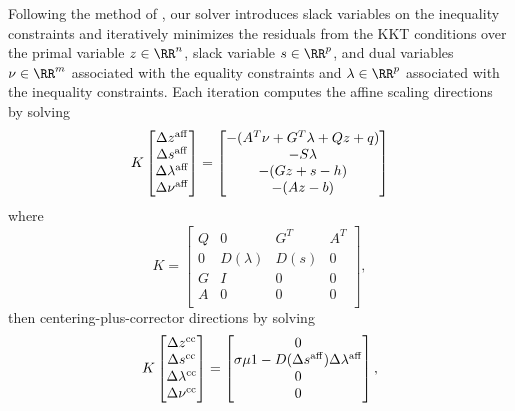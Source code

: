 Following the method of \citet{mattingley2012cvxgen},
our solver introduces slack variables on the inequality constraints
and iteratively minimizes the residuals from the KKT conditions
over the primal variable $z\in\RR^n$, slack variable $s\in\RR^p$,
and dual variables
$\nu\in\RR^m$ associated with the equality constraints and
$\lambda\in\RR^p$ associated with the inequality constraints.
Each iteration computes the affine scaling directions by solving
\begin{equation}
  K
  \begin{bmatrix}
    \Delta z^{\rm aff} \\
    \Delta s^{\rm aff} \\
    \Delta \lambda^{\rm aff} \\
    \Delta \nu^{\rm aff} \\
  \end{bmatrix}
  =
  \begin{bmatrix}
    -(A^T\nu + G^T\lambda + Qz + q) \\
    -S\lambda \\
    -(Gz+s-h) \\
    -(Az-b) \\
  \end{bmatrix}
  \label{eq:cvxgen:affine}
\end{equation}
where
\begin{equation*}
  K =
  \begin{bmatrix}
    Q & 0 & G^T & A^T \\
    0 & D(\lambda) & D(s) & 0 \\
    G & I & 0 & 0 \\
    A & 0 & 0 & 0 \\
  \end{bmatrix},
\end{equation*}
then centering-plus-corrector directions by solving
\begin{equation}
  K
  \begin{bmatrix}
    \Delta z^{\rm cc} \\
    \Delta s^{\rm cc} \\
    \Delta \lambda^{\rm cc} \\
    \Delta \nu^{\rm cc} \\
  \end{bmatrix}
  =
  \begin{bmatrix}
    0 \\
    \sigma\mu 1 - D(\Delta s^{\rm aff}) \Delta \lambda^{\rm aff} \\
    0 \\
    0 \\
  \end{bmatrix},
  \label{eq:cvxgen:cc}
\end{equation}
